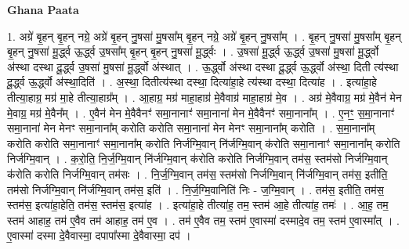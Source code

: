 \documentclass[17pt]{extarticle}
\begin{document}
\textbf{Ghana Paata } \newline

1. अग्रे॑ बृ॒हन् बृ॒हन् नग्रे॒ अग्रे॑ बृ॒हन् नु॒षसा॑ मु॒षसा᳚म् बृ॒हन् नग्रे॒ अग्रे॑ बृ॒हन् नु॒षसा᳚म् । . बृ॒हन् नु॒षसा॑ मु॒षसा᳚म् बृ॒हन् बृ॒हन् नु॒षसा॑ मू॒र्द्ध्व ऊ॒र्द्ध्व उ॒षसा᳚म् बृ॒हन् बृ॒हन् नु॒षसा॑ मू॒र्द्ध्वः । . उ॒षसा॑ मू॒र्द्ध्व ऊ॒र्द्ध्व उ॒षसा॑ मु॒षसा॑ मू॒र्द्ध्वो अ॑स्था दस्था दू॒र्द्ध्व उ॒षसा॑ मु॒षसा॑ मू॒र्द्ध्वो अ॑स्थात् । . ऊ॒र्द्ध्वो अ॑स्था दस्था दू॒र्द्ध्व ऊ॒र्द्ध्वो अ॑स्था॒ दिती त्य॑स्था दू॒र्द्ध्व ऊ॒र्द्ध्वो अ॑स्था॒दिति॑ । . अ॒स्था॒ दितीत्य॑स्था दस्था॒ दित्या॑हा॒हे त्य॑स्था दस्था॒ दित्या॑ह । . इत्या॑हा॒हे तीत्या॒हाग्र॒ मग्र॑ मा॒हे तीत्या॒हाग्र᳚म् । . आ॒हाग्र॒ मग्र॑ माहा॒हाग्र॑ मे॒वैवाग्र॑ माहा॒हाग्र॑ मे॒व । . अग्र॑ मे॒वैवाग्र॒ मग्र॑ मे॒वैन॑ मेन मे॒वाग्र॒ मग्र॑ मे॒वैन᳚म् । . ए॒वैन॑ मेन मे॒वैवैनꣳ॑ समा॒नानाꣳ॑ समा॒नाना॑ मेन मे॒वैवैनꣳ॑ समा॒नाना᳚म् । . ए॒नꣳ॒॒ स॒मा॒नानाꣳ॑ समा॒नाना॑ मेन मेनꣳ समा॒नाना᳚म् करोति करोति समा॒नाना॑ मेन मेनꣳ समा॒नाना᳚म् करोति । . स॒मा॒नाना᳚म् करोति करोति समा॒नानाꣳ॑ समा॒नाना᳚म् करोति निर्जग्मि॒वान् नि॑र्जग्मि॒वान् क॑रोति समा॒नानाꣳ॑ समा॒नाना᳚म् करोति निर्जग्मि॒वान् । . क॒रो॒ति॒ नि॒र्ज॒ग्मि॒वान् नि॑र्जग्मि॒वान् क॑रोति करोति निर्जग्मि॒वान् तम॑स॒ स्तम॑सो निर्जग्मि॒वान् क॑रोति करोति निर्जग्मि॒वान् तम॑सः । . नि॒र्ज॒ग्मि॒वान् तम॑स॒ स्तम॑सो निर्जग्मि॒वान् नि॑र्जग्मि॒वान् तम॑स॒ इतीति॒ तम॑सो निर्जग्मि॒वान् नि॑र्जग्मि॒वान् तम॑स॒ इति॑ । . नि॒र्ज॒ग्मि॒वानिति॑ निः - ज॒ग्मि॒वान् । . तम॑स॒ इतीति॒ तम॑स॒ स्तम॑स॒ इत्या॑हा॒हेति॒ तम॑स॒ स्तम॑स॒ इत्या॑ह । . इत्या॑हा॒हे तीत्या॑ह॒ तम॒ स्तम॑ आ॒हे तीत्या॑ह॒ तमः॑ । . आ॒ह॒ तम॒ स्तम॑ आहाह॒ तम॑ ए॒वैव तम॑ आहाह॒ तम॑ ए॒व । . तम॑ ए॒वैव तम॒ स्तम॑ ए॒वास्मा॑ दस्मादे॒व तम॒ स्तम॑ ए॒वास्मा᳚त् । . ए॒वास्मा॑ दस्मा दे॒वैवास्मा॒ दपापा᳚स्मा दे॒वैवास्मा॒ दप॑ । \newline
\end{document}
